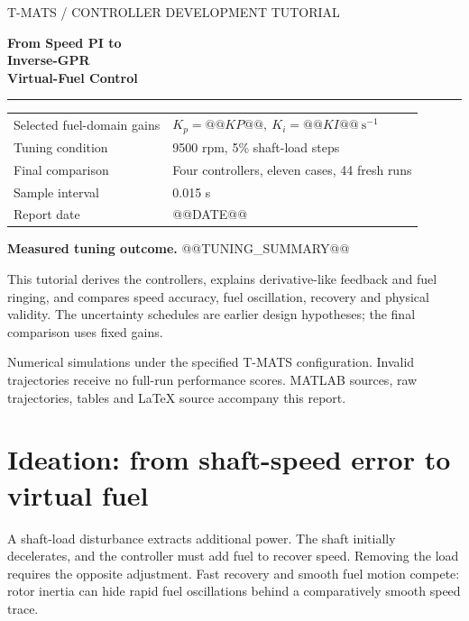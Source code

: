 \begin{titlepage}
\color{navy}\sffamily
{\small T-MATS / CONTROLLER DEVELOPMENT TUTORIAL}\par\vspace{18mm}
{\fontsize{30}{36}\selectfont\bfseries From Speed PI to\\Inverse-GPR\\Virtual-Fuel Control\par}
\vspace{9mm}{\Large Ideation, derivation, uncertainty experiments,\\and fixed-gain retuning for reduced fuel ringing\par}
\vspace{10mm}\color{teal}\rule{\linewidth}{1.2pt}\color{navy}\vspace{8mm}
\begin{tabular}{@{}ll}
Selected fuel-domain gains & $K_p=@@KP@@,\ K_i=@@KI@@\ \mathrm{s}^{-1}$\\[5pt]
Tuning condition & 9500 rpm, 5\% shaft-load steps\\[5pt]
Final comparison & Four controllers, eleven cases, 44 fresh runs\\[5pt]
Sample interval & 0.015 s\\[5pt]
Report date & @@DATE@@
\end{tabular}
\par\vspace{12mm}\normalfont\color{ink}
\textbf{Measured tuning outcome.} @@TUNING_SUMMARY@@

This tutorial derives the controllers, explains derivative-like feedback and fuel ringing, and compares speed accuracy, fuel oscillation, recovery and physical validity. The uncertainty schedules are earlier design hypotheses; the final comparison uses fixed gains.

\vfill Numerical simulations under the specified T-MATS configuration. Invalid trajectories receive no full-run performance scores. MATLAB sources, raw trajectories, tables and LaTeX source accompany this report.
\end{titlepage}
\tableofcontents\clearpage
\section{Ideation: from shaft-speed error to virtual fuel}
A shaft-load disturbance extracts additional power. The shaft initially decelerates, and the controller must add fuel to recover speed. Removing the load requires the opposite adjustment. Fast recovery and smooth fuel motion compete: rotor inertia can hide rapid fuel oscillations behind a comparatively smooth speed trace.

